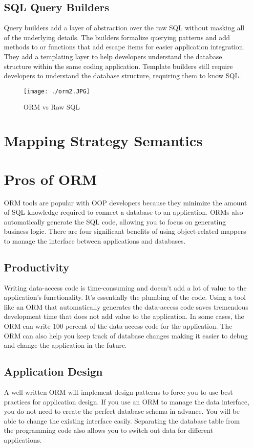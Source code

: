 \documentclass[10pt,a4paper,twoside]{article}
\begin{document}
\subsection{SQL Query Builders}
\item Query builders add a layer of abstraction over the raw SQL without masking all of the underlying details. The builders formalize querying patterns and add methods to or functions that add escape items for easier application integration. They add a templating layer to help developers understand the database structure within the same coding application. Template builders still require developers to understand the database structure, requiring them to know SQL.
\begin{figure}
  \texttt{[image: ./orm2.JPG]}
  \caption{ORM vs Raw SQL}
  \label{fig:ORM vs SQL}
\end{figure}


\section{Mapping Strategy Semantics}
\item


\section{Pros of ORM}
\item ORM tools are popular with OOP developers because they minimize the amount of SQL knowledge required to connect a database to an application. ORMs also automatically generate the SQL code, allowing you to focus on generating business logic. There are four significant benefits of using object-related mappers to manage the interface between applications and databases.
\subsection{Productivity}
\item Writing data-access code is time-consuming and doesn’t add a lot of value to the application’s functionality. It’s essentially the plumbing of the code. Using a tool like an ORM that automatically generates the data-access code saves tremendous development time that does not add value to the application. In some cases, the ORM can write 100 percent of the data-access code for the application. The ORM can also help you keep track of database changes making it easier to debug and change the application in the future.
\subsection{Application Design}
\item A well-written ORM will implement design patterns to force you to use best practices for application design. If you use an ORM to manage the data interface, you do not need to create the perfect database schema in advance. You will be able to change the existing interface easily. Separating the database table from the programming code also allows you to switch out data for different applications.
\end{document}
